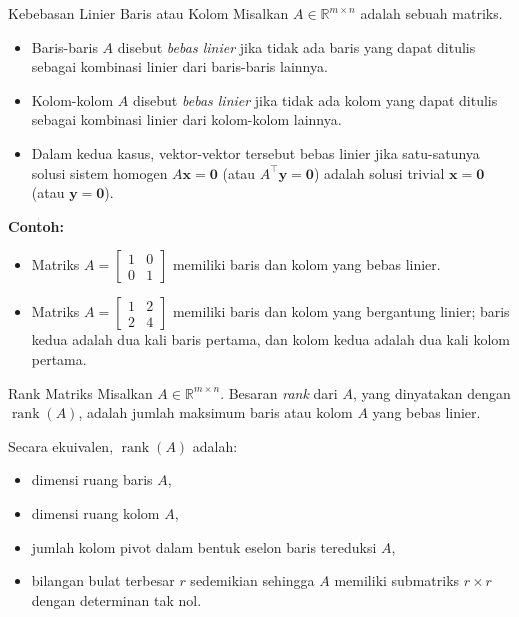 \begin{definition}{Kebebasan Linier Baris atau Kolom}{}
Misalkan \( A \in \mathbb{R}^{m \times n} \) adalah sebuah matriks.

\begin{itemize}
  \item Baris-baris \( A \) disebut \emph{bebas linier} jika tidak ada baris yang dapat ditulis sebagai kombinasi linier dari baris-baris lainnya.
  
  \item Kolom-kolom \( A \) disebut \emph{bebas linier} jika tidak ada kolom yang dapat ditulis sebagai kombinasi linier dari kolom-kolom lainnya.
  
  \item Dalam kedua kasus, vektor-vektor tersebut bebas linier jika satu-satunya solusi sistem homogen \( A \mathbf{x} = \mathbf{0} \) (atau \( A^\top \mathbf{y} = \mathbf{0} \)) adalah solusi trivial \( \mathbf{x} = \mathbf{0} \) (atau \( \mathbf{y} = \mathbf{0} \)).
\end{itemize}
\end{definition}

\textbf{Contoh:}
\begin{itemize}
    \item Matriks \( A = \begin{bmatrix}1 & 0 \\ 0 & 1\end{bmatrix} \) memiliki baris dan kolom yang bebas linier.
    \item Matriks \( A = \begin{bmatrix}1 & 2 \\ 2 & 4\end{bmatrix} \) memiliki baris dan kolom yang bergantung linier; baris kedua adalah dua kali baris pertama, dan kolom kedua adalah dua kali kolom pertama.
\end{itemize}

\vspace{1em}

\begin{definition}{Rank Matriks}{}
Misalkan \( A \in \mathbb{R}^{m \times n} \). Besaran \emph{rank} dari \( A \), yang dinyatakan dengan \( \operatorname{rank}(A) \), adalah jumlah maksimum baris atau kolom \( A \) yang bebas linier.

Secara ekuivalen, \( \operatorname{rank}(A) \) adalah:
\begin{itemize}
  \item dimensi ruang baris \( A \),
  \item dimensi ruang kolom \( A \),
  \item jumlah kolom pivot dalam bentuk eselon baris tereduksi \( A \),
  \item bilangan bulat terbesar \( r \) sedemikian sehingga \( A \) memiliki submatriks \( r \times r \) dengan determinan tak nol.
\end{itemize}
\end{definition}

